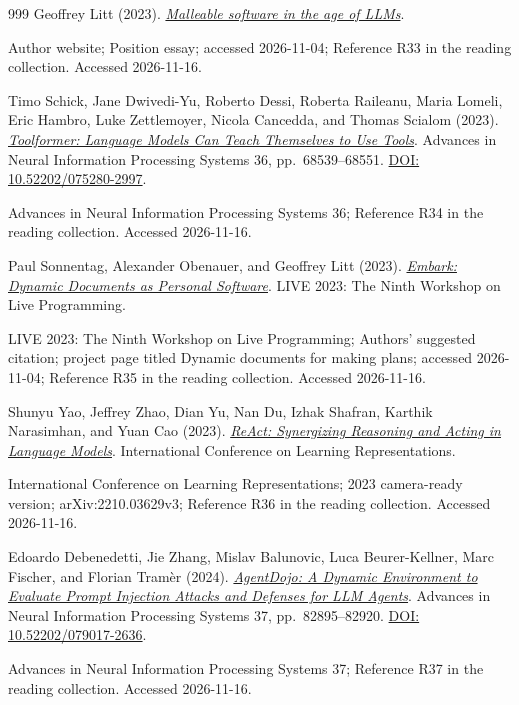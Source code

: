 \documentclass[11pt,letterpaper]{article}
\begin{document}
\begin{thebibliography}{999}
Geoffrey Litt (2023).
\href{https://www.geoffreylitt.com/2023/03/25/llm-end-user-programming.html}{\emph{Malleable software in the age of LLMs}}.
\par {\small Author website; Position essay; accessed 2026-11-04; Reference R33 in the reading collection.}
{\small Accessed 2026-11-16.}

Timo Schick, Jane Dwivedi-Yu, Roberto Dessi, Roberta Raileanu, Maria Lomeli, Eric Hambro, Luke Zettlemoyer, Nicola Cancedda, and Thomas Scialom (2023).
\href{https://doi.org/10.52202/075280-2997}{\emph{Toolformer: Language Models Can Teach Themselves to Use Tools}}.
Advances in Neural Information Processing Systems 36, pp.~68539--68551.
\href{https://doi.org/10.52202/075280-2997}{DOI: 10.52202/075280-2997}.
\par {\small Advances in Neural Information Processing Systems 36; Reference R34 in the reading collection.}
{\small Accessed 2026-11-16.}

Paul Sonnentag, Alexander Obenauer, and Geoffrey Litt (2023).
\href{https://www.inkandswitch.com/embark/}{\emph{Embark: Dynamic Documents as Personal Software}}.
LIVE 2023: The Ninth Workshop on Live Programming.
\par {\small LIVE 2023: The Ninth Workshop on Live Programming; Authors' suggested citation; project page titled Dynamic documents for making plans; accessed 2026-11-04; Reference R35 in the reading collection.}
{\small Accessed 2026-11-16.}

Shunyu Yao, Jeffrey Zhao, Dian Yu, Nan Du, Izhak Shafran, Karthik Narasimhan, and Yuan Cao (2023).
\href{https://arxiv.org/abs/2210.03629}{\emph{ReAct: Synergizing Reasoning and Acting in Language Models}}.
International Conference on Learning Representations.
\par {\small International Conference on Learning Representations; 2023 camera-ready version; arXiv:2210.03629v3; Reference R36 in the reading collection.}
{\small Accessed 2026-11-16.}

Edoardo Debenedetti, Jie Zhang, Mislav Balunovic, Luca Beurer-Kellner, Marc Fischer, and Florian Tramèr (2024).
\href{https://doi.org/10.52202/079017-2636}{\emph{AgentDojo: A Dynamic Environment to Evaluate Prompt Injection Attacks and Defenses for LLM Agents}}.
Advances in Neural Information Processing Systems 37, pp.~82895--82920.
\href{https://doi.org/10.52202/079017-2636}{DOI: 10.52202/079017-2636}.
\par {\small Advances in Neural Information Processing Systems 37; Reference R37 in the reading collection.}
{\small Accessed 2026-11-16.}


\end{thebibliography}
\end{document}

